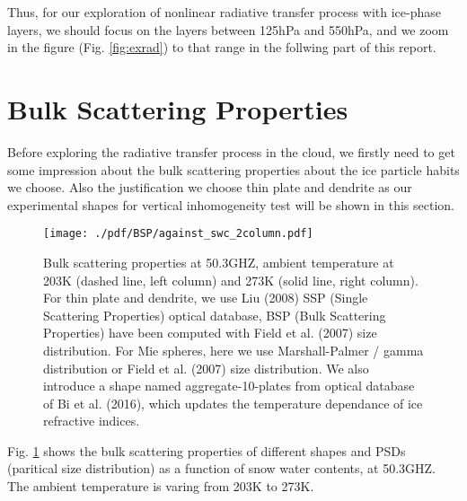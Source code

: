 \documentclass[a4paper]{report}
\begin{document}
Thus, for our exploration of nonlinear radiative transfer process with ice-phase layers, we should focus on the layers between
125hPa and 550hPa, and we zoom in the figure (Fig. \ref{fig:exrad}) to that range in the follwing part of this report.

\clearpage

\section{Bulk Scattering Properties}
Before exploring the radiative transfer process in the cloud, we firstly need to get some impression about the bulk scattering properties 
about the ice particle habits we choose. Also the justification we choose thin plate and dendrite as our experimental shapes for vertical inhomogeneity
test will be shown in this section.

\begin{figure}[hbtp] 
\centering
\texttt{[image: ./pdf/BSP/against\_swc\_2column.pdf]}
\caption{Bulk scattering properties at 50.3GHZ, ambient temperature at 203K (dashed line, left column) and 273K (solid line, right column).
For thin plate and dendrite, we use Liu (2008) SSP (Single Scattering Properties) optical database,
BSP (Bulk Scattering Properties) have been computed with Field et al. (2007) size distribution.
For Mie spheres, here we use Marshall-Palmer / gamma distribution or Field et al. (2007) size distribution.
We also introduce a shape named aggregate-10-plates from optical database of Bi et al. (2016), which updates the temperature dependance 
of ice refractive indices.}
\label{fig:against_swc_2column}
\end{figure}

Fig. \ref{fig:against_swc_2column} shows the bulk scattering properties of different shapes and PSDs (paritical size distribution) as a
function of snow water contents, at 50.3GHZ. The ambient temperature is varing from 203K to 273K. 
\end{document}
